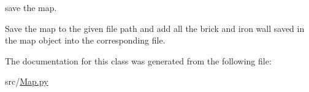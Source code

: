 save the map. 

Save the map to the given file path and add all the brick and iron wall saved in the map object into the corresponding file. 

The documentation for this class was generated from the following file\+:\begin{DoxyCompactItemize}
\item 
src/\mbox{\hyperlink{_map_8py}{Map.\+py}}\end{DoxyCompactItemize}
